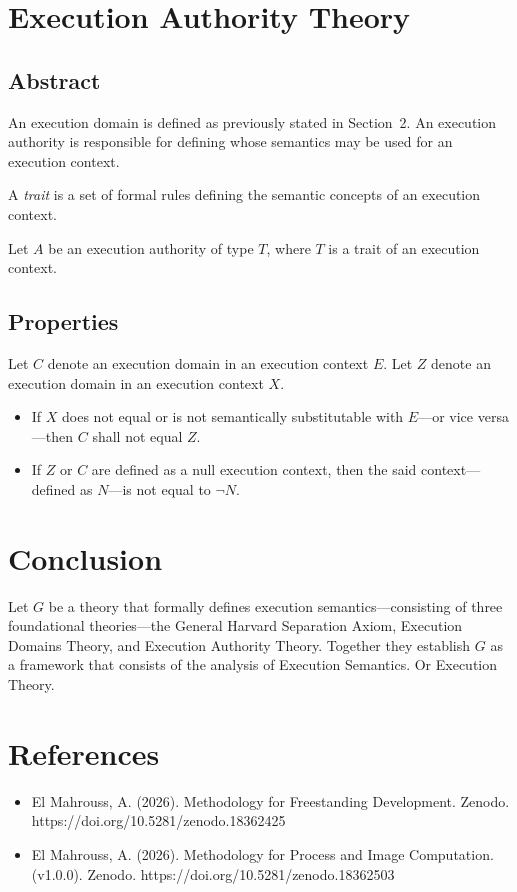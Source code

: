 \documentclass[11pt,a4paper]{article}
\begin{document}
\section{Execution Authority Theory}

\subsection{Abstract}

An execution domain is defined as previously stated in Section~2. An execution authority is responsible for defining whose semantics may be used for an execution context.

A \emph{trait} is a set of formal rules defining the semantic concepts of an execution context.

Let $A$ be an execution authority of type $T$, where $T$ is a trait of an execution context.

\subsection{Properties}

Let $C$ denote an execution domain in an execution context $E$. Let $Z$ denote an execution domain in an execution context $X$.

\begin{itemize}
    \item If $X$ does not equal or is not semantically substitutable with $E$—or vice versa—then $C$ shall not equal $Z$.
    \item If $Z$ or $C$ are defined as a null execution context, then the said context—defined as $N$—is not equal to $\lnot N$.
\end{itemize}

\section{Conclusion}

Let $G$ be a theory that formally defines execution semantics—consisting of three foundational theories—the General Harvard Separation Axiom, Execution Domains Theory, and Execution Authority Theory. Together they establish $G$ as a framework that consists of the analysis of Execution Semantics. Or Execution Theory.

\section{References}

\begin{itemize}
	\item El Mahrouss, A. (2026). Methodology for Freestanding Development. Zenodo. https://doi.org/10.5281/zenodo.18362425
	
	\item El Mahrouss, A. (2026). Methodology for Process and Image Computation. (v1.0.0). Zenodo. https://doi.org/10.5281/zenodo.18362503
\end{itemize}
\end{document}
